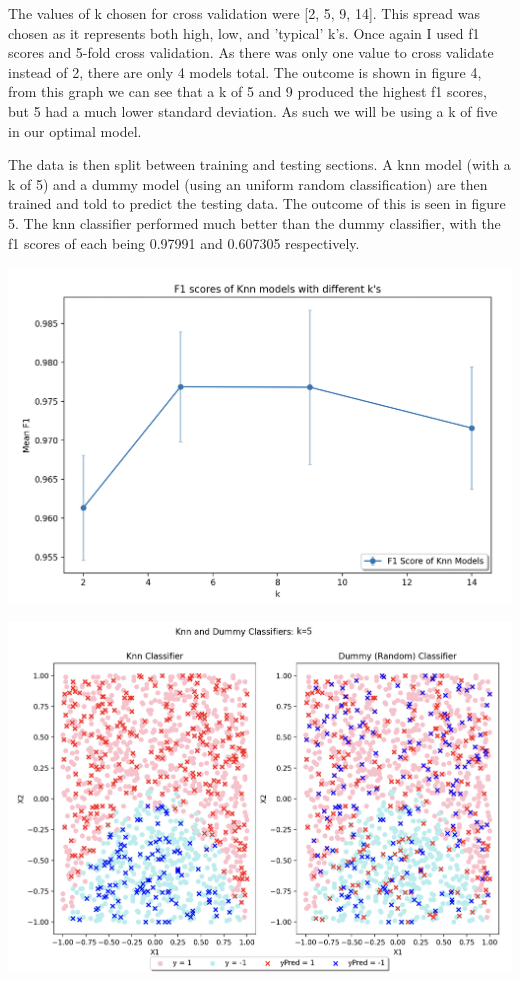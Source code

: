 \documentclass{article}
\begin{document}
The values of k chosen for cross validation were [2, 5, 9, 14]. This spread was chosen as it represents both high, low, and 'typical' k's. Once again I used f1 scores and 5-fold cross validation. As there was only one value to cross validate instead of 2, there are only 4 models total. The outcome is shown in figure 4, from this graph we can see that a k of 5 and 9 produced the highest f1 scores, but 5 had a much lower standard deviation. As such we will be using a k of five in our optimal model.

The data is then split between training and testing sections. A knn model (with a k of 5) and a dummy model (using an uniform random classification) are then trained and told to predict the testing data. The outcome of this is seen in figure 5. The knn classifier performed much better than the dummy classifier, with the f1 scores of each being 0.97991 and 0.607305 respectively.

\begin{center}
\includegraphics[width=.8\linewidth]{ib.png}
\end{center}

\begin{center}
\includegraphics[width=\linewidth]{knn}
\end{center}
\end{document}
